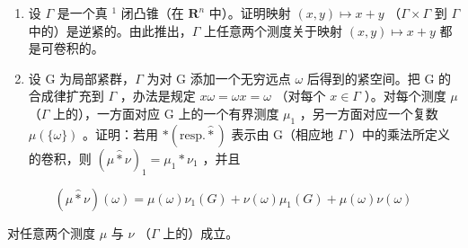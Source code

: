 \exercisesection{}

\begin{enumerate}
\def\labelenumi{\arabic{enumi})}
\item
  设 \(\Gamma\) 是一个真 \(^{1}\) 闭凸锥（在 \(\mathbf{R}^{n}\) 中）。证明映射 \((x,y)\mapsto x+y\) （\(\Gamma\times\Gamma\) 到 \(\Gamma\) 中的）是逆紧的。由此推出，\(\Gamma\) 上任意两个测度关于映射 \((x,y)\mapsto x+y\) 都是可卷积的。
\item
  设 G 为局部紧群，\(\Gamma\) 为对 G 添加一个无穷远点 \(\omega\) 后得到的紧空间。把 G 的合成律扩充到 \(\Gamma\) ，办法是规定 \(x\omega = \omega x = \omega\) （对每个 \(x \in \Gamma\) ）。对每个测度 \(\mu\) （\(\Gamma\) 上的），一方面对应 G 上的一个有界测度 \(\mu_{1}\) ，另一方面对应一个复数 \(\mu(\{\omega\})\) 。证明：若用 \(*(\text{resp.}\widehat{*})\) 表示由 G（相应地 \(\Gamma\) ）中的乘法所定义的卷积，则 \((\mu\widehat{*}\nu)_{1} = \mu_{1}*\nu_{1}\) ，并且
\end{enumerate}

\[
(\mu \widehat {*} \nu) (\omega) = \mu (\omega) \nu_ {1} (G) + \nu (\omega) \mu_ {1} (G) + \mu (\omega) \nu (\omega)
\]

对任意两个测度 \(\mu\) 与 \(\nu\) （\(\Gamma\) 上的）成立。

